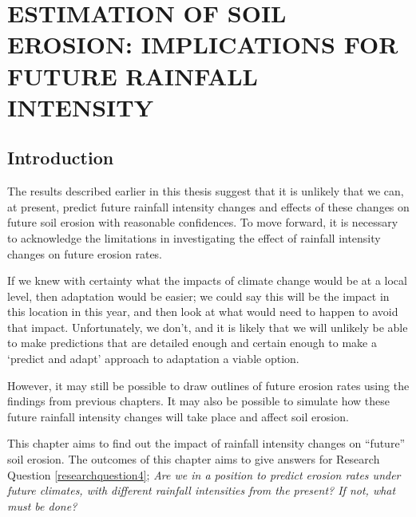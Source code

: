 \chapter{ESTIMATION OF SOIL EROSION: IMPLICATIONS FOR FUTURE RAINFALL
INTENSITY}
\label{sec:ESTIMATIONSOFFUTURESOILEROSION}

\section{Introduction}
\label{sec:FutureSoilErosionIntroduction}

The results described earlier in this thesis suggest that it is unlikely that
we can, at present, predict future rainfall intensity changes and effects of
these changes on future soil erosion with reasonable confidences. To move
forward, it is necessary to acknowledge the limitations in investigating the
effect of rainfall intensity changes on future erosion rates.

If we knew with certainty what the impacts of climate change would be at a local
level, then adaptation would be easier; we could say this will be the impact in
this location in this year, and then look at what would need to happen to avoid
that impact. Unfortunately, we don't, and it is likely that we will unlikely be
able to make predictions that are detailed enough and certain enough to make a
`predict and adapt' approach to adaptation a viable option.

However, it may still be possible to draw outlines of future erosion rates using
the findings from previous chapters. It may also be possible to simulate how
these future rainfall intensity changes will take place and affect soil
erosion.

This chapter aims to find out the impact of rainfall intensity changes on
``future'' soil erosion. The outcomes of this chapter aims to give answers for
Research Question \ref{researchquestion4}; \textit{Are we in a position to
predict erosion rates under future climates, with different rainfall intensities
from the present? If not, what must be done?}



